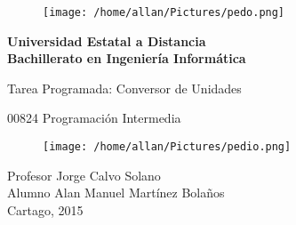 \documentclass[times,12pt]{article}
\begin{document}
\begin{titlepage}
\begin{figure}[ht]
\begin{center}
\vspace{1.5cm}
\texttt{[image: /home/allan/Pictures/pedo.png]}
\label{escudouam1}
\vspace{-1cm}
\end{center}
\end{figure}
\begin{center}
\textbf {Universidad Estatal a Distancia \\
Bachillerato en Ingenier\'ia Inform\'atica}

\vspace{1.5cm} {\LARGE Tarea Programada: Conversor de Unidades }


\vspace{1.5cm} {\LARGE 00824 Programaci\'on Intermedia}

\begin{figure}[h]
\begin{center}
\vspace{0.8cm}
\texttt{[image: /home/allan/Pictures/pedio.png]}
\label{escudocaja}
\vspace{-1cm}
\end{center}
\end{figure}

\vspace{1.3cm} {\LARGE Profesor Jorge Calvo Solano}\\
\vspace{1.3cm} {\LARGE Alumno Alan Manuel Mart\'inez Bola\~nos} \\


\vspace{2.3cm} Cartago, 2015
\end{center}
\end{titlepage}





\makeatletter       %
\renewcommand\tableofcontents{%
    \if@twocolumn
      \@restonecoltrue\onecolumn
    \else
      \@restonecolfalse
    \fi
            \begin{center}      %
            \Large              %
            \bfseries           %
            \contentsname       %
            \end{center}        %
            \addvspace{1cm}     %
    \@mkboth{%
       \MakeUppercase\contentsname}{\MakeUppercase\contentsname}}        %
    \if@restonecol\twocolumn\fi
   \vspace{20.8cm}
 
\end{document}
